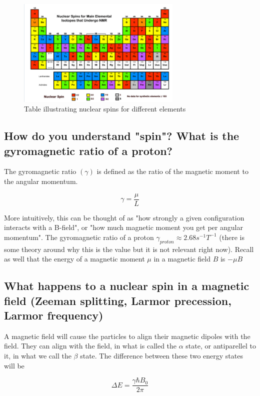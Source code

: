 \documentclass[12pt]{article}
\begin{document}
\begin{figure}[h!]
  \centering
  \includegraphics[width=0.7\textwidth]{element_spin.png}
  \caption{Table illustrating nuclear spins for different elements \cite{mri_questions_nuclear_spin}}
  \label{fig:example}
\end{figure}


\subsection{How do you understand "spin"? What is the gyromagnetic ratio of a proton?}

The gyromagnetic ratio $(\gamma)$ is defined as the ratio of the magnetic moment to the angular momentum.

\[\gamma = \frac{\mu}{L}\]

More intuitively, this can be thought of as "how strongly a given configuration interacts with a B-field", or "how much magnetic moment you get per angular momentum". The gyromagnetic ratio of a proton $\gamma_{proton} \approx 2.68 s^{-1}T^{-1}$ (there is some theory around why this is the value but it is not relevant right now). Recall as well that the energy of a magnetic moment $\mu$ in a magnetic field $B$ is $-\mu B$

\subsection{What happens to a nuclear spin in a magnetic field (Zeeman splitting, Larmor precession, Larmor frequency)}

A magnetic field will cause the particles to align their magnetic dipoles with the field. They can align with the field, in what is called the $\alpha$ state, or antiparellel to it, in what we call the $\beta$ state. The difference between these two energy states will be

\[\Delta E = \frac{\gamma \hbar B_0}{2\pi} \]
\end{document}
